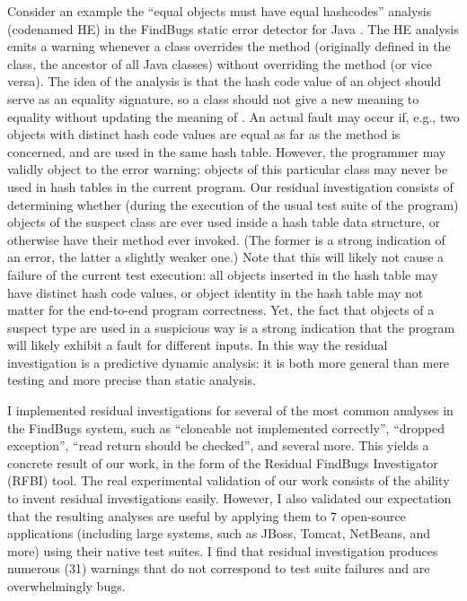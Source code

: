 \documentclass[proposal]{umthesis} %
\begin{document}
Consider an example the ``equal objects must have equal hashcodes''
analysis (codenamed HE) in the FindBugs static error detector for Java
\cite{hovemeyer04finding,hovemeyer07finding,Ayewah:2010:GFF:1831708.1831738}. The HE
analysis emits a warning whenever a class overrides the method
 (originally defined in the  class, the
ancestor of all Java classes) without overriding the 
method (or vice versa). The idea of the analysis is that the hash code
value of an object should serve as an equality signature, so a class
should not give a new meaning to equality without updating the meaning
of . An actual fault may occur if, e.g., two objects
with distinct hash code values are equal as far as the 
method is concerned, and are used in the same hash table. 
However, the programmer may validly object to the error
warning: objects of this particular class may never be used
in hash tables in the current program.  Our residual investigation
consists of determining whether (during the execution of the usual
test suite of the program) objects of the suspect class are ever
used inside a hash table data structure, or otherwise have their
 method ever invoked. (The former is a strong indication
of an error, the latter a slightly weaker one.)  Note that this will
likely not cause a failure of the current test execution: all objects
inserted in the hash table may have distinct hash code values, or
object identity in the hash table may not matter for the end-to-end
program correctness. Yet, the fact that objects of a suspect type
are used in a suspicious way is a strong indication that the
program will likely exhibit a fault for different inputs. In this way
the residual investigation is a predictive dynamic analysis: it is
both more general than mere testing and more precise than static analysis.

I implemented residual investigations for several of the most common analyses in the FindBugs system, such as “cloneable not implemented correctly”, “dropped exception”, “read return should be checked”, and several more. This yields a concrete result of our work, in the form of the Residual FindBugs Investigator (RFBI) tool.  The real experimental validation of our work consists of the ability to invent residual investigations easily. However, I also validated our expectation that the resulting analyses are useful by applying them to 7 open-source applications (including large systems, such as JBoss, Tomcat, NetBeans, and more) using their native test suites. I find that residual investigation produces numerous (31) warnings that do not correspond to test suite failures and are overwhelmingly bugs.
\end{document}
